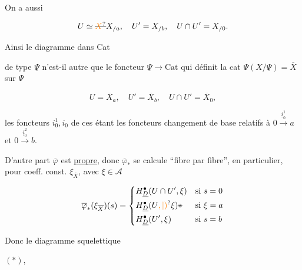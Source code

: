 
On a aussi

\[
 U\simeq \deleted{\unsure{X}}X_{/a},\quad U'=X_{/b},\quad U\cap U'=X_{/0}.
\]

Ainsi le diagramme dans Cat


de type $\underline\Psi$ n'est-il autre que le foncteur $\underline\Psi\longrightarrow\mathrm{Cat}$ qui définit la cat  $\Psi(X/\underline\Psi)=\overline X$ sur $\Psi$


\[
 U=\overline X_a,\quad U'=\overline X_b,\quad U\cap U'=\overline X_0,
\]

les foncteurs $i_0^1,i_0$ de ces étant les foncteurs changement de base relatifs à $0\xrightarrow{\underline i_0^1}a$ et $0\xrightarrow{\underline i_0^2}b$. 

D'autre part $\overline\varphi$ est \uline{propre}, donc $\overline\varphi_*$ se calcule ``fibre par fibre'', en particulier, pour coeff. const. $\xi_{\overline X}$, avec $\xi\in\mathcal A$

\[
 \overline\varphi_*(\xi_{\overline X})(s)=
 \left\{\begin{aligned}
  &H_{\underline D}^{\bullet}(U\cap U',\xi)&&\text{si }s=0\\
  &H^\bullet_{\underline D}(U\unsure{,|)}\xi)\deleted{*}&&\text{si }\xi=a\\
  &H^\bullet_{\underline D}(U',\xi)&&\text{si }s=b
 \end{aligned}\right.
\]


Donc le diagramme squelettique

$(*)$\quad{},


